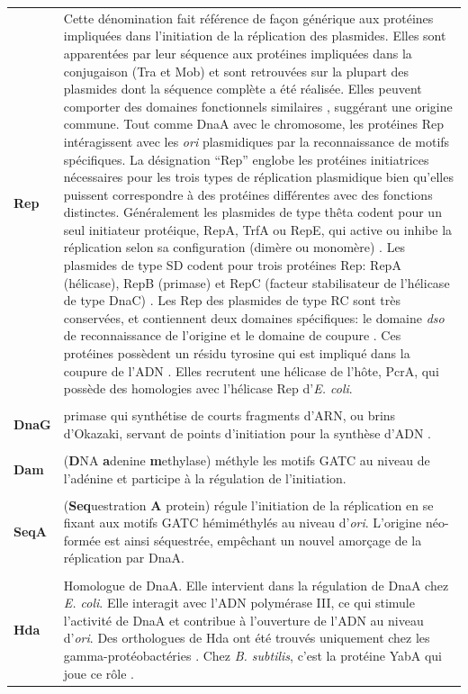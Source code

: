 \begin{longtable}{@{\hspace{-2cm}\hspace{1cm}} >{\bfseries}p{} | >{\small}p{}}
	Rep & Cette dénomination fait référence de façon générique aux protéines impliquées dans l'initiation de la réplication des plasmides. Elles sont apparentées par leur séquence aux protéines impliquées dans la conjugaison (Tra et Mob) \citep{DelSolar1998} et sont retrouvées sur la plupart des plasmides dont la séquence complète a été réalisée. Elles peuvent comporter des domaines fonctionnels similaires \citep{DelSolar1998}, suggérant une origine commune. Tout comme DnaA avec le chromosome, les protéines Rep intéragissent avec les \textit{ori} plasmidiques par la reconnaissance de motifs spécifiques. La désignation “Rep” englobe les protéines initiatrices nécessaires pour les trois types de réplication plasmidique bien qu'elles puissent correspondre à des protéines différentes avec des fonctions distinctes. Généralement les plasmides de type thêta codent pour un seul initiateur protéique, RepA, TrfA ou RepE, qui active ou inhibe la réplication selon sa configuration (dimère ou monomère) \citep{Kruger2004}. Les plasmides de type SD codent pour trois protéines Rep: RepA (hélicase), RepB (primase) et RepC (facteur stabilisateur de l'hélicase de type DnaC) \citep{DelSolar1998}. Les Rep des plasmides de type RC sont très conservées, et contiennent deux domaines spécifiques: le domaine \textit{dso} de reconnaissance de l'origine et le domaine de coupure  \citep{khan2005plasmid}. Ces protéines possèdent un résidu tyrosine qui est impliqué dans la coupure de l'ADN \citep{khan2005plasmid}. Elles recrutent une hélicase de l'hôte, PcrA, qui possède des homologies avec l'hélicase Rep d'\textit{E. coli}.\\
	\\[-0.2cm]
	 DnaG & primase qui synthétise de courts fragments d'ARN, ou brins d'Okazaki, servant de points d'initiation pour la synthèse d'ADN \citep{o2013principles}.\\
	\\[-0.2cm]
	 Dam & (\textbf{D}NA \textbf{a}denine \textbf{m}ethylase) méthyle les motifs GATC au niveau de l'adénine et participe à la régulation de l'initiation.\\
	\\[-0.2cm]
	 SeqA & (\textbf{Seq}uestration \textbf{A} protein) régule l'initiation de la réplication en se fixant aux motifs GATC hémiméthylés au niveau d'\textit{ori}. L'origine néo-formée est ainsi séquestrée, empêchant un nouvel amorçage de la réplication par DnaA.\\
	\\[-0.2cm]
	 Hda & Homologue de DnaA. Elle intervient dans la régulation de DnaA chez \textit{E. coli}. Elle interagit avec l'ADN polymérase III, ce qui stimule l'activité de DnaA et contribue à l'ouverture de l'ADN au niveau d'\textit{ori}. Des orthologues de Hda ont été trouvés uniquement chez les gamma-protéobactéries \citep{zakrzewska2007regulation}. Chez \textit{B. subtilis}, c'est la protéine YabA qui joue ce rôle \citep{Mott2007}. \\

\end{longtable}
